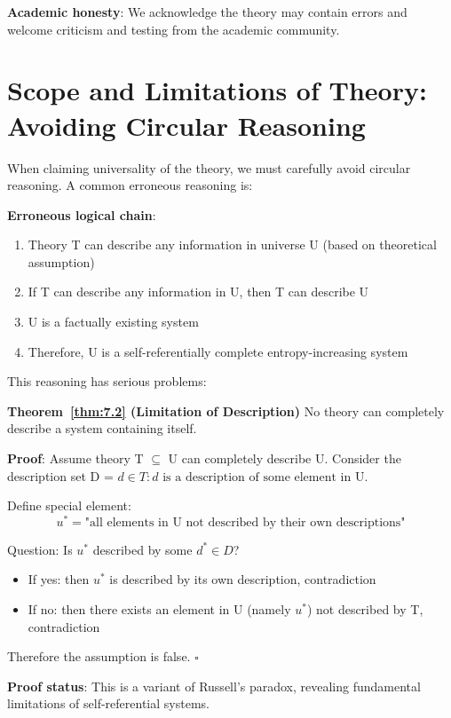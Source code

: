 \textbf{Academic honesty}:
We acknowledge the theory may contain errors and welcome criticism and testing from the academic community.

\section{Scope and Limitations of Theory: Avoiding Circular Reasoning}
\label{sec:ch09_defense:scope-and-limitations-of-theory-avoiding-circular-reasoning}

When claiming universality of the theory, we must carefully avoid circular reasoning. A common erroneous reasoning is:

\textbf{Erroneous logical chain}:
\begin{enumerate}
\item Theory T can describe any information in universe U (based on theoretical assumption)
\item If T can describe any information in U, then T can describe U
\item U is a factually existing system
\item Therefore, U is a self-referentially complete entropy-increasing system
\end{enumerate}

This reasoning has serious problems:

\textbf{Theorem~\ref{thm:7.2} (Limitation of Description)}
\label{thm:7.2}
No theory can completely describe a system containing itself.

\textbf{Proof}:
Assume theory T $\subseteq$ U can completely describe U.
Consider the description set D = ${d \in T : d\text{ is a description of some element in U}}$.

Define special element:
\begin{equation}
u^* = \text{"all elements in U not described by their own descriptions"}
\end{equation}

Question: Is $u^*$ described by some $d^* \in D$?
\begin{itemize}
\item If yes: then $u^*$ is described by its own description, contradiction
\item If no: then there exists an element in U (namely $u^*$) not described by T, contradiction
\end{itemize}

Therefore the assumption is false. $\square$

\textbf{Proof status}: This is a variant of Russell's paradox, revealing fundamental limitations of self-referential systems.

